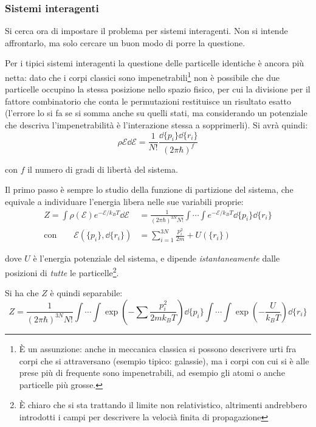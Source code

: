 \subsubsection{Sistemi interagenti}
Si cerca ora di impostare il problema per sistemi interagenti. Non si intende affrontarlo, ma solo cercare un buon modo di porre la questione.
\newline

Per i tipici sistemi interagenti la questione delle particelle identiche è ancora più netta: dato che i corpi classici sono impenetrabili\footnote{\`E un assunzione: anche in meccanica classica si possono descrivere urti fra corpi che si attraversano (esempio tipico: galassie), ma i corpi con cui si è alle prese più di frequente sono impenetrabili, ad esempio gli atomi o anche particelle più grosse.} non è possibile che due particelle occupino la stessa posizione nello spazio fisico, per cui la divisione per il fattore combinatorio che conta le permutazioni restituisce un risultato esatto (l'errore lo si fa se si somma anche su quelli stati, ma considerando un potenziale che descriva l'impenetrabilità è l'interazione stessa a sopprimerli). Si avrà quindi:
\begin{equation*}
\rho{\mathcal{E}} \dd \mathcal{E} = \frac{1}{N!} \frac{\dd\{p_i\} \dd \{ r_i\}}{(2\pi \hbar)^f}
\end{equation*}

\noindent con $f$ il numero di gradi di libertà del sistema.

Il primo passo è sempre lo studio della funzione di partizione del sistema, che equivale a individuare l'energia libera nelle sue variabili proprie:
\begin{align*}
	Z = \int \rho(\mathcal{E}) e^{-\mathcal{E}/k_B T} \dd \mathcal{E} &= \frac{1}{(2\pi \hbar)^{3N} N!}\int \cdots \int e^{-\mathcal{E}/k_B T} \dd\{p_i\} \dd \{ r_i\}\\
	\text{con}\qquad\mathcal{E}(\{p_i\}, \dd \{ r_i\}) &= \sum_{i =1}^{3N} \frac{p_i^2}{2m} + U(\{r_i\})
\end{align*}

\noindent dove $U$ è l'energia potenziale del sistema, e dipende \textit{istantaneamente} dalle posizioni di \textit{tutte} le particelle\footnote{\`E chiaro che si sta trattando il limite non relativistico, altrimenti andrebbero introdotti i campi per descrivere la velocià finita di propagazione}.

Si ha che $Z$ è quindi separabile:
\begin{equation*}
Z = \frac{1}{(2\pi \hbar)^{3N} N!}\int \cdots \int \exp \left(- \sum \frac{p_i^2}{2 m k_B T}\right) \dd\{p_i\} \int \cdots \int \exp \left( - \frac{U}{k_B T}\right) \dd \{ r_i\}
\end{equation*}

